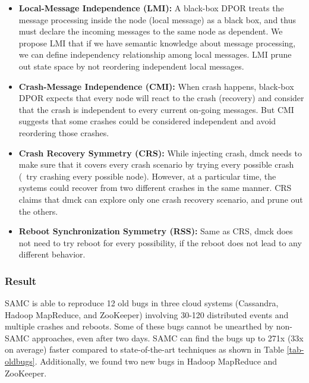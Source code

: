 \begin{itemize}

\item {\bf Local-Message Independence (LMI):} A black-box DPOR treats the
message processing inside the node (local message) as a black box, and thus must
declare the incoming messages to the same node as dependent. We propose LMI that
if we have semantic knowledge about message processing, we can define
independency relationship among local messages. LMI prune out state space by not
reordering independent local messages.

\item {\bf Crash-Message Independence (CMI):} When crash happens, black-box DPOR
expects that every node will react to the crash (recovery) and consider that the
crash is independent to every current on-going messages. But CMI suggests that
some crashes could be considered independent and avoid reordering those crashes.

\item {\bf Crash Recovery Symmetry (CRS):} While injecting crash, dmck needs to
make sure that it covers every crash scenario by trying every possible crash
(\ie\ try crashing every possible node). However, at a particular time, the
systems could recover from two different crashes in the same manner. CRS claims
that dmck can explore only one crash recovery scenario, and prune out the
others.

\item {\bf Reboot Synchronization Symmetry (RSS):} Same as CRS, dmck does not
need to try reboot for every possibility, if the reboot does not lead to any
different behavior.

\end{itemize}

\subsubsection{Result}



SAMC is able to reproduce 12 old bugs in three cloud systems (Cassandra, Hadoop
MapReduce, and ZooKeeper) involving 30-120 distributed events and multiple
crashes and reboots. Some of these bugs cannot be unearthed by non-SAMC
approaches, even after two days. SAMC can find the bugs up to 271x (33x on
average) faster compared to state-of-the-art techniques as shown in Table
\ref{tab-oldbugs}. Additionally, we found two new bugs in Hadoop MapReduce and
ZooKeeper.


